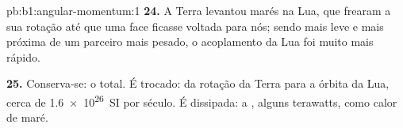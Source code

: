 \begin{solution}{pb:b1:angular-momentum:1}
\textbf{24.} A Terra levantou marés na Lua, que frearam a sua rotação
até que uma face ficasse voltada para nós; sendo mais leve e mais próxima de um parceiro
mais pesado, o acoplamento da Lua foi muito mais rápido.

\textbf{25.} Conserva-se: o  total. É trocado:  da rotação da Terra para a órbita da Lua, cerca de \qty{1.6e26}{SI}
por século. É dissipada: a , alguns terawatts, como calor
de maré.
\end{solution}
